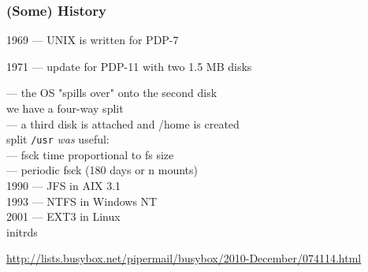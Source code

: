 \documentclass[]{beamer}
\newcommand\pp{}
\begin{document}
\begin{frame}
  \frametitle{(Some) History}

  \pp
  1969 — \textsc{\small UNIX} is written for PDP-7\\
  \pp
  1971 — update for PDP-11 with two 1.5 MB disks\\
  \pp
  \phantom{1670} — the OS "spills over" onto the second disk\\
  \phantom{1670 —} we have a four-way split\\
  \pp
  \phantom{1670} — a third disk is attached and /home is created\\
  \pp

  split \texttt{/usr} \textit{was} useful:\\
  \pp
  \phantom{1670} — fsck time proportional to fs size\\
  \phantom{1670} — periodic fsck (180 days or n mounts)\\
  \pp

  1990 — JFS in AIX 3.1\\
  1993 — NTFS in Windows NT\\
  2001 — EXT3 in Linux\\

  \pp
  initrds

  \vfill

  \tiny
  \url{http://lists.busybox.net/pipermail/busybox/2010-December/074114.html}\vspace{-5em}
\end{frame}
\end{document}
